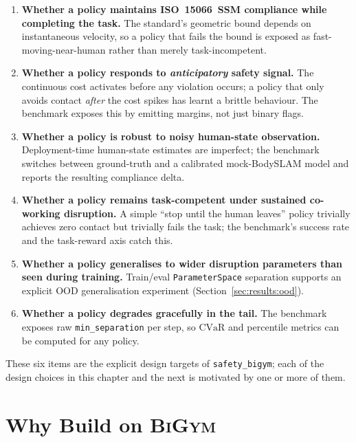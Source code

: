 \documentclass[11pt,a4paper]{report}
\newcommand{\ssm}{SSM}
\newcommand{\iso}{ISO~15066}
\newcommand{\cvar}{\ensuremath{\mathrm{CVaR}}}
\newcommand{\bigym}{\textsc{BiGym}}
\newcommand{\sbigym}{\texttt{safety\_bigym}}
\newcommand{\bodyslampp}{BodySLAM\nolinebreak[4]\hspace{-.05em}\raisebox{.2ex}{\scriptsize ++}}
\begin{document}
\begin{enumerate}[topsep=2pt,itemsep=2pt]
\item \textbf{Whether a policy maintains \iso{}~\ssm{} compliance
  while completing the task.} The standard's geometric bound
  depends on instantaneous velocity, so a policy that fails the
  bound is exposed as fast-moving-near-human rather than merely
  task-incompetent.
\item \textbf{Whether a policy responds to \emph{anticipatory}
  safety signal.} The continuous cost activates before any
  violation occurs; a policy that only avoids contact \emph{after}
  the cost spikes has learnt a brittle behaviour. The benchmark
  exposes this by emitting margins, not just binary flags.
\item \textbf{Whether a policy is robust to noisy human-state
  observation.} Deployment-time human-state estimates are imperfect;
  the benchmark switches between ground-truth and a calibrated
  mock-\bodyslampp{} model and reports the resulting compliance
  delta.
\item \textbf{Whether a policy remains task-competent under
  sustained co-working disruption.} A simple ``stop until the
  human leaves'' policy trivially achieves zero contact but
  trivially fails the task; the benchmark's success rate and the
  task-reward axis catch this.
\item \textbf{Whether a policy generalises to wider disruption
  parameters than seen during training.} Train/eval
  \texttt{ParameterSpace} separation supports an explicit OOD
  generalisation experiment (Section~\ref{sec:results:ood}).
\item \textbf{Whether a policy degrades gracefully in the tail.}
  The benchmark exposes raw \texttt{min\_separation} per step, so
  \cvar{} and percentile metrics can be computed for any policy.
\end{enumerate}

These six items are the explicit design targets of \sbigym{}; each
of the design choices in this chapter and the next is motivated by
one or more of them.

\section{Why Build on \bigym{}}
\label{sec:bench:why-bigym}
\end{document}
